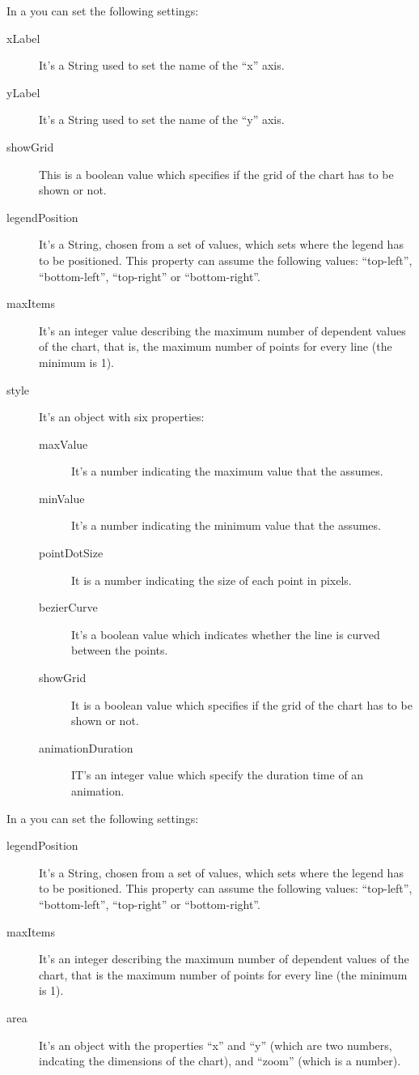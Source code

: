 				In a  you can set the following settings:
				\begin{description}
					\item[xLabel] It's a String used to set the name of the “x” axis.
					\item[yLabel] It's a String used to set the name of the “y” axis.
					\item[showGrid] This is a boolean value which specifies if the grid of the chart has to be shown or not.
					\item[legendPosition] It's a String, chosen from a set of values, which sets where the legend has to be positioned. This property can assume the following values: “top-left”, “bottom-left”, “top-right” or “bottom-right”.
					\item[maxItems] It's an integer value describing the maximum number of dependent values of the chart, that is, the maximum number of points for every line (the minimum is 1).
					\item[style] It's an object with six properties:
						\begin{description}
							\item[maxValue] It's a number indicating the maximum value that the  assumes.
							\item[minValue] It's a number indicating the minimum value that the  assumes.
							\item[pointDotSize] It is a number indicating the size of each point in pixels.
							\item[bezierCurve] It's a boolean value which indicates whether the line is curved between the points.
							\item[showGrid] It is a boolean value which specifies if the grid of the chart has to be shown or not.
							\item[animationDuration] IT's an integer value which specify the duration time of an animation.
						\end{description}
				\end{description}
				In a  you can set the following settings:
				\begin{description}
					\item[legendPosition] It's a String, chosen from a set of values, which sets where the legend has to be positioned. This property can assume the following values: “top-left”, “bottom-left”, “top-right” or “bottom-right”.
					\item[maxItems] It's an integer describing the maximum number of dependent values of the chart, that is the maximum number of points for every line (the minimum is 1).
					\item[area] It's an object with the properties “x” and “y” (which are two numbers, indcating the dimensions of the chart), and “zoom” (which is a number).
				\end{description}
